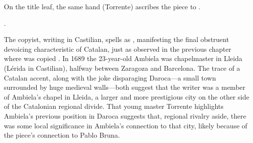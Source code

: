 On the title leaf, the same hand (Torrente) ascribes the piece to .%
\begin{Footnote}
    .
\end{Footnote}
The copyist, writing in Castilian, spells  as ,
manifesting the final obstruent devoicing characteristic of Catalan, just as
observed in the previous chapter where  was copied
.  
In 1689 the 23-year-old Ambiela was chapelmaster in Lleida (Lérida in
Castilian), halfway between Zaragoza and Barcelona.
The trace of a Catalan accent, along with the joke disparaging Daroca---a small
town surrounded by huge medieval walls---both suggest that the writer was a
member of Ambiela's chapel in Lleida, a larger and more prestigious city on the
other side of the Catalonian regional divide.
That young master Torrente highlights Ambiela's previous position in Daroca
suggests that, regional rivalry aside, there was some local significance in
Ambiela's connection to that city, likely because of the piece's connection to
Pablo Bruna.

\endinput

Calahorra sees a \quoted{great similarity} between Ambiela's setting and that of Bruna, but it would be better to think of Ambiela's piece as an homage rather than a parody.
	\autocite[18]{Calahorra:Suban}
Obviously, both pieces begin with four voices in an upward-leaping gesture high in their tessituras.
Both composers set the words \quoted{Suban las voces al cielo} as a musical phrase three compases (nine minims) long.
Bruna, in his work for a single chorus, accomplishes \term{anaphora} by repeating this first phrase transposed up a third.
Ambiela does Bruna one better with his stretto entrance of the second chorus, as though he has taken Bruna's two opening phrases and superimposed them.
Next in Bruna's setting (Bruna \measures{6--9}), a solo voice sings the beginning of the phrase and the full chorus joins for the end. 
Ambiela again expands on Bruna's approach for his second phrase (Ambiela \measures{3--9}): he begins not with a single voice but with two, and then expands these into a fugato.

